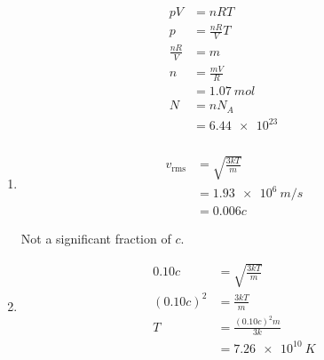 \documentclass{article}
\begin{document}
\setcounter{subsubsection}{26}
\subsubsection{}

\begin{align*}
  p V           & = n R T           \\
  p             & = \frac{n R}{V} T \\
  \frac{n R}{V} & = m               \\
  n             & = \frac{m V}{R}   \\
                & = \qty{1.07}{mol} \\
  N             & = n N_A           \\
                & = \num{6.44e23}
\end{align*}

\setcounter{subsubsection}{28}
\subsubsection{}

\begin{enumerate}
  \item

        \begin{align*}
          v_\text{rms} & = \sqrt{\frac{3 k T}{m}} \\
                       & = \qty{1.93e6}{m/s}      \\
                       & = 0.006 c
        \end{align*}

        Not a significant fraction of $c$.

  \item

        \begin{align*}
          0.10 c     & = \sqrt{\frac{3 k T}{m}}   \\
          (0.10 c)^2 & = \frac{3 k T}{m}          \\
          T          & = \frac{(0.10 c)^2 m}{3 k} \\
                     & = \qty{7.26e10}{K}
        \end{align*}
\end{enumerate}

\setcounter{subsubsection}{30}
\subsubsection{}
\end{document}
